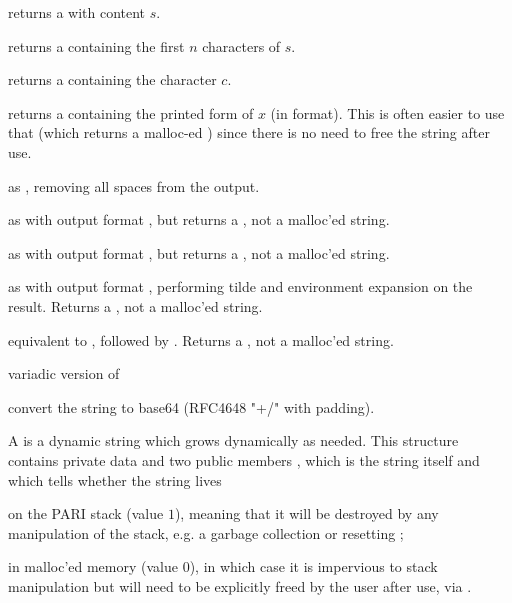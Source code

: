 
 returns a  with content $s$.

returns a  containing the first $n$ characters of $s$.

 returns a  containing the character
$c$.

 returns a  containing the printed
form of $x$ (in  format). This is often easier to use that
 (which returns a malloc-ed ) since there is no need
to free the string after use.

 as , removing all
spaces from the output.

 as  with output format ,
but returns a , not a malloc'ed string.

 as  with output format ,
but returns a , not a malloc'ed string.

 as  with output format ,
performing tilde and environment expansion on the result. Returns a
, not a malloc'ed string.

 equivalent to
, followed by . Returns a ,
not a malloc'ed string.

 variadic version of

 convert the string to base64 (RFC4648
"+/" with padding).


A  is a dynamic string which grows dynamically as needed.
This structure contains private data and two public members ,
which is the string itself and  which tells whether the
string lives

\item on the PARI stack (value $1$), meaning that it will be destroyed by any
manipulation of the stack, e.g. a garbage collection or resetting
;

\item in malloc'ed memory (value $0$), in which case it is impervious to
stack manipulation but will need to be explicitly freed by the user
after use, via .


